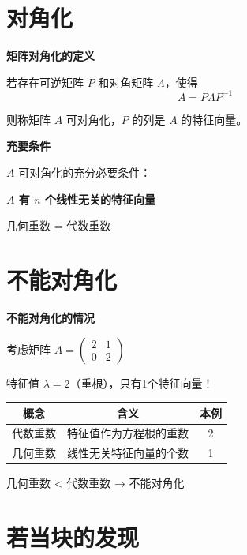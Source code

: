 \documentclass[aspectratio=169,12pt]{beamer}
\begin{document}
\section{对角化}

\begin{frame}
\fontsize{11}{13}\selectfont
\centerline{\textbf{矩阵对角化的定义}}

\bigskip
若存在可逆矩阵 $P$ 和对角矩阵 $\Lambda$，使得
\[
A = P\Lambda P^{-1}
\]

则称矩阵 $A$ 可对角化，$P$ 的列是 $A$ 的特征向量。
\end{frame}

\begin{frame}
\fontsize{10}{12}\selectfont
\centerline{\textbf{充要条件}}

\bigskip
$A$ 可对角化的充分必要条件：

\bigskip
\centerline{\textbf{$A$ 有 $n$ 个线性无关的特征向量}}

\bigskip
\pause
几何重数 = 代数重数
\end{frame}

\section{不能对角化}

\begin{frame}
\fontsize{10}{12}\selectfont
\centerline{\textbf{不能对角化的情况}}

\bigskip
考虑矩阵 $A = \begin{pmatrix} 2 & 1 \\ 0 & 2 \end{pmatrix}$

\pause
\bigskip
特征值 $\lambda = 2$（重根），只有1个特征向量！

\pause
\bigskip
\begin{center}
\begin{tabular}{|c|c|c|}
\hline
概念 & 含义 & 本例 \\
\hline
代数重数 & 特征值作为方程根的重数 & 2 \\
\hline
几何重数 & 线性无关特征向量的个数 & 1 \\
\hline
\end{tabular}
\end{center}

\pause
\bigskip
几何重数 < 代数重数 → 不能对角化
\end{frame}

\section{若当块的发现}
\end{document}
